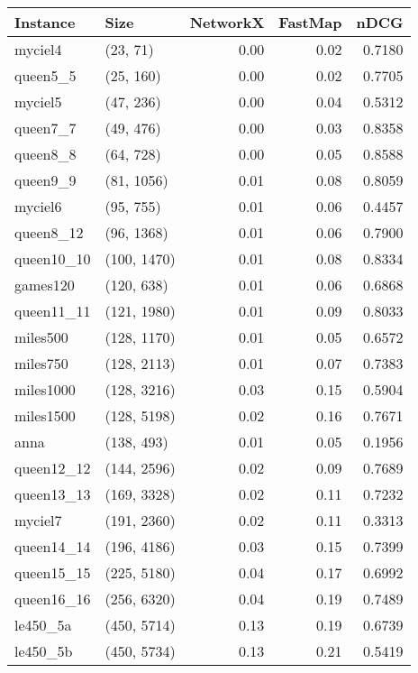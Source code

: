 \begin{tabular}{llrrr}
\toprule
  Instance &         Size &  NetworkX &  FastMap &   nDCG \\
\midrule
   myciel4 &     (23, 71) &      0.00 &     0.02 & 0.7180 \\
  queen5\_5 &    (25, 160) &      0.00 &     0.02 & 0.7705 \\
   myciel5 &    (47, 236) &      0.00 &     0.04 & 0.5312 \\
  queen7\_7 &    (49, 476) &      0.00 &     0.03 & 0.8358 \\
  queen8\_8 &    (64, 728) &      0.00 &     0.05 & 0.8588 \\
  queen9\_9 &   (81, 1056) &      0.01 &     0.08 & 0.8059 \\
   myciel6 &    (95, 755) &      0.01 &     0.06 & 0.4457 \\
 queen8\_12 &   (96, 1368) &      0.01 &     0.06 & 0.7900 \\
queen10\_10 &  (100, 1470) &      0.01 &     0.08 & 0.8334 \\
  games120 &   (120, 638) &      0.01 &     0.06 & 0.6868 \\
queen11\_11 &  (121, 1980) &      0.01 &     0.09 & 0.8033 \\
  miles500 &  (128, 1170) &      0.01 &     0.05 & 0.6572 \\
  miles750 &  (128, 2113) &      0.01 &     0.07 & 0.7383 \\
 miles1000 &  (128, 3216) &      0.03 &     0.15 & 0.5904 \\
 miles1500 &  (128, 5198) &      0.02 &     0.16 & 0.7671 \\
      anna &   (138, 493) &      0.01 &     0.05 & 0.1956 \\
queen12\_12 &  (144, 2596) &      0.02 &     0.09 & 0.7689 \\
queen13\_13 &  (169, 3328) &      0.02 &     0.11 & 0.7232 \\
   myciel7 &  (191, 2360) &      0.02 &     0.11 & 0.3313 \\
queen14\_14 &  (196, 4186) &      0.03 &     0.15 & 0.7399 \\
queen15\_15 &  (225, 5180) &      0.04 &     0.17 & 0.6992 \\
queen16\_16 &  (256, 6320) &      0.04 &     0.19 & 0.7489 \\
  le450\_5a &  (450, 5714) &      0.13 &     0.19 & 0.6739 \\
  le450\_5b &  (450, 5734) &      0.13 &     0.21 & 0.5419 \\

\end{tabular}
